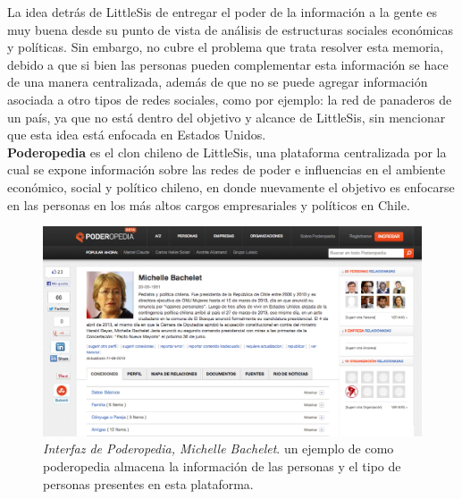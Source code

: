 La idea detrás de LittleSis de entregar el poder de la información a la gente es muy buena desde su punto de vista de análisis de estructuras sociales económicas y políticas. Sin embargo, no cubre el problema que trata resolver esta memoria, debido a que si bien las personas pueden complementar esta información se hace de una manera centralizada, además de que no se puede agregar información asociada a otro tipos de redes sociales, como por ejemplo: la red de panaderos de un país, ya que no está dentro del objetivo y alcance de LittleSis, sin mencionar que esta idea está enfocada en Estados Unidos.\\

\textbf{Poderopedia} es el clon chileno de LittleSis, una plataforma centralizada por la cual se expone información sobre las redes de poder e influencias en el ambiente económico, social y político chileno, en donde nuevamente el objetivo es enfocarse en las personas en los más altos cargos empresariales y políticos en Chile.\\

\begin{figure}[H]
  \includegraphics[width=1.0\textwidth]{images/poderopedia.png}
  \caption[Interfaz de Poderopedia, Michelle Bachelet]{\emph{Interfaz de Poderopedia, Michelle Bachelet}. un ejemplo de como poderopedia almacena la información de las personas y el tipo de personas presentes en esta plataforma.}
  \label{ejemplo_poderopedia}
\end{figure}

